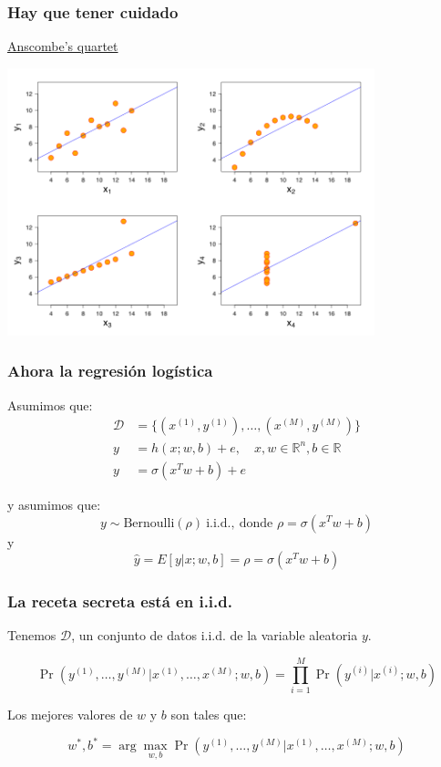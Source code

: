 \documentclass{beamer}
\begin{document}
\begin{frame}
  \frametitle{Hay que tener cuidado}

  \begin{center}
    \href{https://en.wikipedia.org/wiki/Anscombe\%27s_quartet}{Anscombe's quartet}

    \includegraphics[width=0.8\textwidth]{./img/anscombie.png}    
  \end{center}
  
\end{frame}

\begin{frame}
  \frametitle{Ahora la regresión logística}

Asumimos que:
  \begin{align*}
    \mathcal{D} &= \{(x^{(1)}, y^{(1)}), \ldots, (x^{(M)}, y^{(M)})\} \\
    y &= h(x; w, b) + e, \quad x, w \in \mathbb{R}^n, b \in  \mathbb{R} \\
    y &= \sigma(x^T w + b) + e
    \end{align*}

    y asumimos que:
    $$
    y \sim \text{Bernoulli}(\rho) \ \text{i.i.d.}, \ \text{donde } \rho = \sigma(x^T w + b)
    $$
    y 
    $$
    \hat{y} = E[y | x; w, b] = \rho = \sigma(x^T w + b)
    $$
\end{frame}

\begin{frame}
  \frametitle{La receta secreta está en i.i.d.}

  Tenemos $\mathcal{D}$, un conjunto de datos i.i.d. de la variable aleatoria $y$.

  $$
  \Pr(y^{(1)}, \ldots, y^{(M)} | x^{(1)}, \ldots, x^{(M)}; w, b) = \prod_{i=1}^M \Pr(y^{(i)} | x^{(i)}; w, b)
  $$

  Los mejores valores de $w$ y $b$ son tales que:

  $$
  w^*, b^* = \arg \max_{w, b} \Pr(y^{(1)}, \ldots, y^{(M)} | x^{(1)}, \ldots, x^{(M)}; w, b)
  $$
\end{frame}
\end{document}
